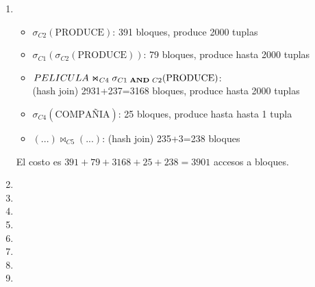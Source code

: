 \documentclass[10pt]{article}
\begin{document}
\begin{enumerate}
\begin{enumerate}
\end{enumerate}

 \item

\begin{itemize}

\item $\sigma_{C2}(\text{PRODUCE})$: 391 bloques, produce 2000 tuplas

\item $\sigma_{C1}(\sigma_{C2}(\text{PRODUCE}))$: 79 bloques, produce hasta 2000 tuplas

\item $PELICULA \Join_{C4} \sigma_{C1 \text{ {\bf AND} } C2}(\text{PRODUCE})$: \\
      (hash join) 2931+237=3168 bloques, produce hasta 2000 tuplas

\item $\sigma_{C4}(\text{COMPAÑIA})$: 25 bloques, produce hasta hasta 1 tupla

\item $(...) \Join_{C5} (...)$: (hash join) 235+3=238 bloques

\end{itemize}

El costo es $391+79+3168+25+238=3901$ accesos a bloques.

 \item

 \item

 \item

 \item

 \item

 \item

 \item

 \item

\end{enumerate}
\end{document}
